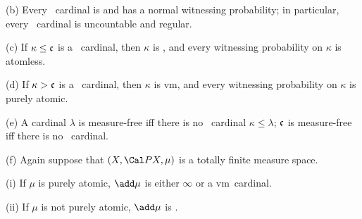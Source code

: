 (b) Every \rvm\ cardinal is \qm{} and has a
normal witnessing
probability;  in particular, every \rvm\ cardinal is uncountable and
regular.

(c) If $\kappa\le\frak c$ is a \rvm\ cardinal, then $\kappa$ is \am, and
every witnessing probability on $\kappa$ is atomless.

(d) If $\kappa>\frak c$ is a \rvm\ cardinal, then $\kappa$ is \2vm, and
every witnessing probability on $\kappa$ is purely atomic.

(e) A cardinal $\lambda$ is measure-free
iff there is no \rvm\ cardinal $\kappa\le\lambda$;  $\frak c$ is
measure-free iff there is no \am\ cardinal.

(f) Again suppose that $(X,\Cal PX,\mu)$ is a totally finite
measure space.

\quad(i) If $\mu$ is purely atomic, $\add\mu$ is either $\infty$ or
a \2vm\ cardinal.

\quad(ii) If $\mu$ is not purely atomic, $\add\mu$ is \am.

